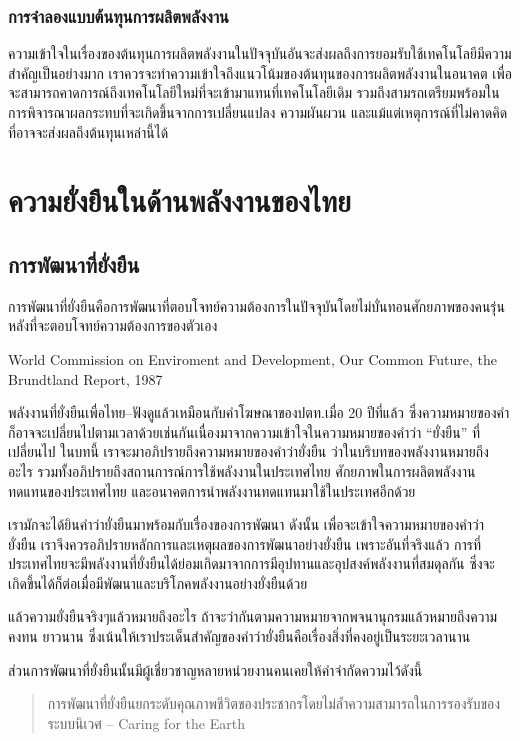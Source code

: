 \documentclass[a4paper,nobib,openany,10pt]{tufte-book}
\begin{document}
\section{การจำลองแบบต้นทุนการผลิตพลังงาน}
\label{sec:orgfac10dd}
ความเข้าใจในเรื่องของต้นทุนการผลิตพลังงานในปัจจุบันอันจะส่งผลถึงการยอมรับใช้เทคโนโลยีมีความสำคัญเป็นอย่างมาก เราควรจะทำความเข้าใจถึงแนวโน้มของต้นทุนของการผลิตพลังงานในอนาคต เพื่อจะสามารถคาดการณ์ถึงเทคโนโลยีใหม่ที่จะเข้ามาแทนที่เทคโนโลยีเดิม รวมถึงสามรถเตรียมพร้อมในการพิจารณาผลกระทบที่จะเกิดขึ้นจากการเปลี่ยนแปลง ความผันผวน และแม้แต่เหตุการณ์ที่ไม่คาดคิดที่อาจจะส่งผลถึงต้นทุนเหล่านี้ได้


\part{ความยั่งยืนในด้านพลังงานของไทย}
\label{sec:org05405bf}
\chapter{การพัฒนาที่ยั่งยืน}
\label{sec:org876a663}

\epigraph{การพัฒนาที่ยั่งยืนคือการพัฒนาที่ตอบโจทย์ความต้องการในปัจจุบันโดยไม่บั่นทอนศักยภาพของคนรุ่นหลังที่จะตอบโจทย์ความต้องการของตัวเอง}{World Commission on Enviroment and Development, Our Common Future, the Brundtland Report, 1987}

พลังงานที่ยั่งยืนเพื่อไทย--ฟังดูแล้วเหมือนกับคำโฆษณาของปตท.เมื่อ 20
ปีที่แล้ว
ซึ่งความหมายของคำก็อาจจะเปลี่ยนไปตามเวลาด้วยเช่นกันเนื่องมาจากความเข้าใจในความหมายของคำว่า
``ยั่งยืน'' ที่เปลี่ยนไป ในบทนี้ เราจะมาอภิปรายถึงความหมายของคำว่ายั่งยืน
ว่าในบริบทของพลังงานหมายถึงอะไร
รวมทั้งอภิปรายถึงสถานการณ์การใช้พลังงานในประเทศไทย
ศักยภาพในการผลิตพลังงานทดแทนของประเทศไทย
และอนาคตการนำพลังงานทดแทนมาใช้ในประเทศอีกด้วย

เรามักจะได้ยินคำว่ายั่งยืนมาพร้อมกับเรื่องของการพัฒนา ดังนั้น
เพื่อจะเข้าใจความหมายของคำว่ายั่งยืน
เราจึงควรอภิปรายหลักการและเหตุผลของการพัฒนาอย่างยั่งยืน
เพราะอันที่จริงแล้ว
การที่ประเทศไทยจะมีพลังงานที่ยั่งยืนได้ย่อมเกิดมาจากการมีอุปทานและอุปสงค์พลังงานที่สมดุลกัน
ซึ่งจะเกิดขึ้นได้ก็ต่อเมื่อมีพัฒนาและบริโภคพลังงานอย่างยั่งยืนด้วย

แล้วความยั่งยืนจริงๆแล้วหมายถึงอะไร
ถ้าจะว่ากันตามความหมายจากพจนานุกรมแล้วหมายถึงความคงทน ยาวนาน
ซึ่งเน้นให้เราประเด็นสำคัญของคำว่ายั่งยืนคือเรื่องสิ่งที่คงอยู่เป็นระยะเวลานาน

ส่วนการพัฒนาที่ยั่งยืนนั้นมีผู้เชี่ยวชาญหลายหน่วยงานคนเคยให้คำจำกัดความไว้ดังนี้

\begin{quote}
การพัฒนาที่ยั่งยืนยกระดับคุณภาพชีวิตของประชากรโดยไม่ล้ำความสามารถในการรองรับของระบบนิเวศ
-- Caring for the Earth
\end{quote}
\end{document}
